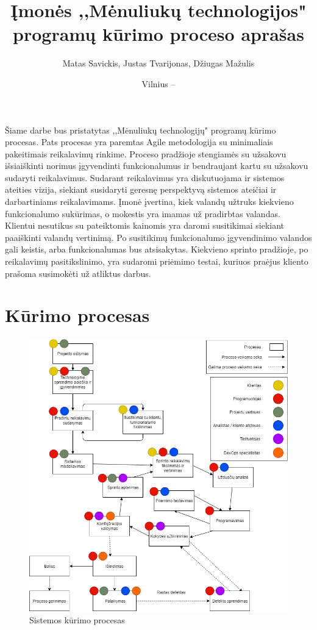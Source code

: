\documentclass{VUMIFPSkursinis}
\title{Įmonės ,,Mėnuliukų technologijos" programų kūrimo proceso aprašas}
\author{Matas Savickis, Justas Tvarijonas, Džiugas Mažulis}
\date{Vilnius – \the\year}
\begin{document}
\maketitle

\tableofcontents

	Šiame darbe bus pristatytas ,,Mėnuliukų technologijų" programų kūrimo procesas.
	Pats procesas yra paremtas Agile metodologija su minimaliais pakeitimais reikalavimų rinkime.
	Proceso pradžioje stengiamės su užsakovu išsiaiškinti norimus įgyvendinti funkcionalumus ir bendraujant kartu su užsakovu sudaryti reikalavimus.
	Sudarant reikalavimus yra diskutuojama ir sistemos ateities vizija, siekiant susidaryti geresnę perspektyvą sistemos ateičiai ir darbartiniams reikalavimams.
	Įmonė įvertina, kiek valandų užtruks kiekvieno funkcionalumo sukūrimas, o mokestis yra imamas už pradirbtas valandas.
	Klientui nesutikus su pateiktomis kainomis yra daromi susitikimai siekiant paaiškinti valandų vertinimą. Po susitikimų funkcionalumo įgyvendinimo valandos gali keistis, arba funkcionalumas bus atsisakytas.
	Kiekvieno sprinto pradžioje, po reikalavimų pasitikslinimo, yra sudaromi priėmimo testai, kuriuos praėjus kliento prašoma susimokėti už atliktus darbus.

\section{Kūrimo procesas}
	\begin{figure}[htbp]
		\includegraphics[scale=0.6]{img/SoftwareProcessMoonTechnologies}
		\caption{Sistemos kūrimo procesas} %
		\label{img:kurimoProcesas}
	\end{figure}
\end{document}
